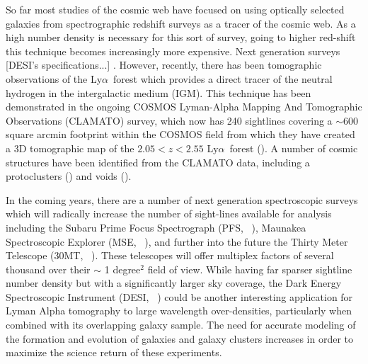 \documentclass[times]{aastex62}
\newcommand{\lya}{Ly$\alpha$}
\begin{document}
So far most studies of the cosmic web have focused on using optically selected galaxies from spectrographic redshift surveys as a tracer of the cosmic web. As a high number density is necessary for this sort of survey, going to higher red-shift this technique becomes increasingly more expensive. Next generation surveys [DESI's specifications...] . However, recently, there has been tomographic observations of the \lya\ forest which provides a direct tracer of the neutral hydrogen in the intergalactic medium (IGM). This technique has been demonstrated in the ongoing COSMOS Lyman-Alpha Mapping And 
Tomographic Observations (CLAMATO) survey, which now has 240 sightlines covering a $\sim 600$ square arcmin footprint within 
the COSMOS field from which they have created a 3D tomographic map of the $2.05<z<2.55$ \lya\ forest (\cite{Lee2017}). A number of cosmic structures have been identified from the CLAMATO data, including a protoclusters (\cite{2016LeeColossus}) and voids (\cite{2018Krolewski}).

In the coming years, there are a number of next generation spectroscopic surveys which will radically increase the number of sight-lines available for analysis including the Subaru Prime Focus Spectrograph (PFS, ~\cite{subaru}), Maunakea Spectroscopic Explorer (MSE, ~\cite{2016MSE}), and further into the future the Thirty Meter Telescope (30MT, ~\cite{2015TMT}). These telescopes will offer multiplex factors of several thousand over their $\sim $ 1 degree$^2$ field of view. While having far sparser sightline number density but with a significantly larger sky coverage, the Dark Energy Spectroscopic Instrument (DESI, ~\cite{desi}) could be another interesting application for Lyman Alpha tomography to large wavelength over-densities, particularly when combined with its overlapping galaxy sample. The need for accurate modeling of the formation and evolution of galaxies and galaxy clusters increases in order to maximize the science return of these experiments.
\end{document}
